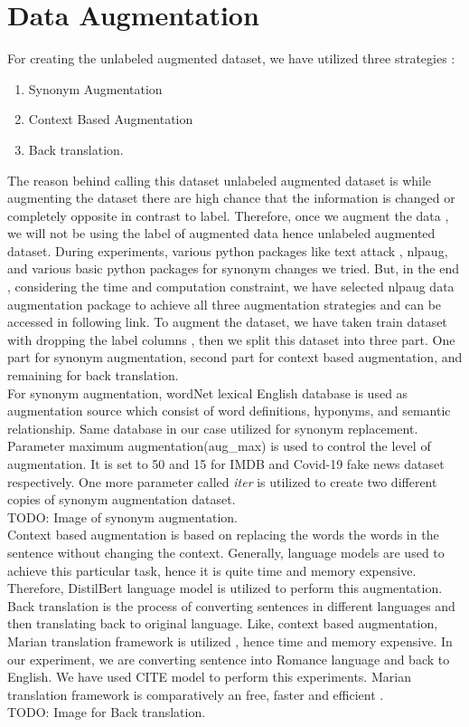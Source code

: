 \documentclass[%
	BCOR=8mm, %
	DIV=12, 
	toc=bibliography, %
	toc=listof, %
	oneside, %
	egregdoesnotlikesansseriftitles, %
	]{scrbook}
\begin{document}
\section{Data Augmentation}
For creating the unlabeled augmented dataset, we have utilized three strategies :
\begin{enumerate}
\item  Synonym Augmentation
\item Context Based Augmentation 
\item Back translation. 
\end{enumerate}
The reason behind calling this dataset unlabeled augmented dataset is while augmenting the dataset there are high chance that the information is changed or completely opposite in contrast to label. Therefore, once we augment the data , we will not be using the label of augmented data hence unlabeled augmented dataset. 
During experiments, various python packages like text attack , nlpaug, and various basic python packages for synonym changes we tried. But, in the end , considering the time and computation constraint,  we have selected nlpaug data augmentation package to achieve all three augmentation strategies and can be accessed in following link.  
To augment the dataset, we have taken train dataset with dropping the label columns , then we split this dataset into three part. One part for synonym augmentation, second part for context based augmentation, and remaining for back translation. \\
For synonym augmentation, wordNet lexical English database is used as augmentation source which consist of word definitions, hyponyms, and semantic relationship. Same database in our case utilized for synonym replacement. Parameter maximum augmentation(aug\_max) is used to control the level of augmentation. It is set to 50 and 15 for IMDB and Covid-19 fake news dataset respectively. One more parameter called \textit{iter} is utilized to create two different copies of synonym augmentation dataset.\\
TODO: Image of synonym augmentation. \\
Context based augmentation is based on replacing the words the words in the sentence without changing the  context. Generally, language models are used to achieve this particular task, hence it is quite time and memory expensive. Therefore, DistilBert language model is utilized to perform this augmentation. \\
Back translation is the process of converting sentences in different languages and then translating back to original language.  Like, context based augmentation, Marian translation framework is utilized , hence time and memory expensive. In our experiment, we are converting sentence into Romance language and back to English. We have used CITE model to perform this experiments. Marian translation framework is comparatively an free, faster and efficient . \\
TODO: Image for Back translation.
\end{document}
